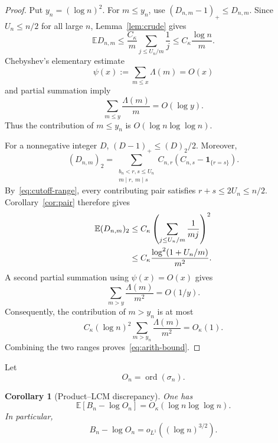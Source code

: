 \documentclass[11pt]{article}
\newtheorem{corollary}[theorem]{Corollary}
\theoremstyle{remark}
\newcommand{\Ee}{\mathbb E}
\newcommand{\one}{\mathbf 1}
\newcommand{\ord}{\operatorname{ord}}
\begin{document}
\begin{proof}
Put $y_n=(\log n)^2$.  For $m\leq y_n$, use
$(D_{n,m}-1)_+\leq D_{n,m}$.  Since $U_n\leq n/2$ for all large $n$,
Lemma~\ref{lem:crude} gives
\[
 \Ee D_{n,m}
 \leq\frac{C_\kappa}{m}\sum_{j\leq U_n/m}\frac1j
 \leq C_\kappa\frac{\log n}{m}.
\]
Chebyshev's elementary estimate~\cite{HardyWright2008}
\[
 \psi(x):=\sum_{m\leq x}\Lambda(m)=O(x)
\]
and partial summation imply
\begin{equation}\label{eq:cheb-harmonic}
 \sum_{m\leq y}\frac{\Lambda(m)}m=O(\log y).
\end{equation}
Thus the contribution of $m\leq y_n$ is
$O(\log n\log\log n)$.

For a nonnegative integer $D$,
$(D-1)_+\leq(D)_2/2$.  Moreover,
\begin{equation}\label{eq:D-factorial-expand}
 (D_{n,m})_2
 =\sum_{\substack{b_n<r,s\leq U_n\\m\mid r,\ m\mid s}}
 C_{n,r}(C_{n,s}-\one_{\{r=s\}}).
\end{equation}
By~\eqref{eq:cutoff-range}, every contributing pair satisfies
$r+s\leq2U_n\leq n/2$.  Corollary~\ref{cor:pair} therefore gives
\begin{align}
 \Ee(D_{n,m})_2
 &\leq C_\kappa
 \left(\sum_{j\leq U_n/m}\frac1{mj}\right)^2
 \notag\\
 &\leq C_\kappa\frac{\log^2(1+U_n/m)}{m^2}.
 \label{eq:D-factorial-bound}
\end{align}
A second partial summation using $\psi(x)=O(x)$ gives
\begin{equation}\label{eq:cheb-tail}
 \sum_{m>y}\frac{\Lambda(m)}{m^2}=O(1/y).
\end{equation}
Consequently, the contribution of $m>y_n$ is at most
\[
 C_\kappa(\log n)^2
 \sum_{m>y_n}\frac{\Lambda(m)}{m^2}
 =O_\kappa(1).
\]
Combining the two ranges proves~\eqref{eq:arith-bound}.
\end{proof}

Let
\[
 O_n=\ord(\sigma_n).
\]
\begin{corollary}[Product--LCM discrepancy]\label{cor:product-lcm}
One has
\begin{equation}\label{eq:full-product-lcm-L1}
 \Ee[B_n-\log O_n]=O_\kappa(\log n\log\log n).
\end{equation}
In particular,
\begin{equation}\label{eq:full-product-lcm-op}
 B_n-\log O_n=o_{L^1}((\log n)^{3/2}).
\end{equation}
\end{corollary}
\end{document}
